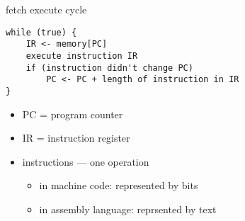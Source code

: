\begin{frame}[fragile,label=fetchExecute]{fetch execute cycle}
\lstset{language=C++}
\begin{lstlisting}
while (true) {
    IR <- memory[PC]
    execute instruction IR
    if (instruction didn't change PC)
        PC <- PC + length of instruction in IR
}
\end{lstlisting}
    \begin{itemize}
    \item PC = program counter
    \item IR = instruction register
    \item instructions --- one operation
        \begin{itemize}
        \item in machine code: represented by bits
        \item in assembly language: reprsented by text
        \end{itemize}
    \end{itemize}
\end{frame}
